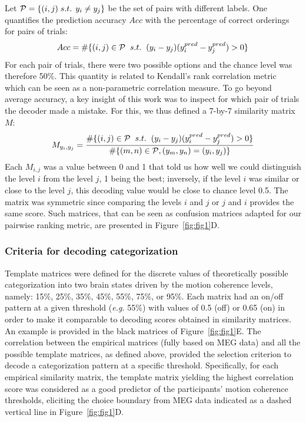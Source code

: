 Let $\mathcal{P}=\{(i,j) \hspace{1mm} s.t. \hspace{1.5mm} y_i \neq y_j\}$ be the set of pairs with different labels. One quantifies the prediction accuracy $Acc$ with the percentage of correct orderings for pairs of trials:
\begin{equation}
	Acc = \#\{(i,j) \in\mathcal{P} \hspace{2mm} s.t. \hspace{2mm} (y_i - y_j)(y_i^{pred} - y_j^{pred}) > 0 \}
\end{equation}
For each pair of trials, there were two possible options and the chance level was therefore 50\%. This quantity is related to Kendall’s rank correlation metric~\cite{46kruskal1958ordinal} which can be seen as a non-parametric correlation measure. To go beyond average accuracy, a key insight of this work was to inspect for which pair of trials the decoder made a mistake. For this, we thus defined a 7-by-7 similarity matrix $M$:
\begin{equation}
	M_{y_i,y_j} = \frac{\#\{(i,j)\in\mathcal{P} \hspace{2mm} s.t. \hspace{2mm} (y_i-y_j)(y_i^{pred}-y_j^{pred}) > 0\}}{\#\{(m,n)\in\mathcal{P}, (y_m, y_n) = (y_i, y_j)\}}
\end{equation}
Each $M_{i,j}$ was a value between 0 and 1 that told us how well we could distinguish the level $i$ from the level $j$, 1 being the best; inversely, if the level $i$ was similar or close to the level $j$, this decoding value would be close to chance level 0.5. The matrix was symmetric since comparing the levels $i$ and $j$ or $j$ and $i$  provides the same score. Such matrices, that can be seen as confusion matrices adapted for our pairwise ranking metric, are presented in Figure~\ref{fig:fig1}D.

\subsubsection*{Criteria for decoding categorization}
Template matrices were defined for the discrete values of theoretically possible categorization into two brain states driven by the motion coherence levels, namely: 15\%, 25\%, 35\%, 45\%, 55\%, 75\%, or 95\%. Each matrix had an on/off pattern at a given threshold (\textit{e.g.} 55\%) with values of 0.5 (off) or 0.65 (on) in order to make it comparable to decoding scores obtained in similarity matrices. An example is provided in the black matrices of Figure~\ref{fig:fig1}E. The correlation between the empirical matrices (fully based on MEG data) and all the possible template matrices, as defined above, provided the selection criterion to decode a categorization pattern at a specific threshold. Specifically, for each empirical similarity matrix, the template matrix yielding the highest correlation score was considered as a good predictor of the participants' motion coherence thresholds, eliciting the choice boundary from MEG data indicated as a dashed vertical line in Figure~\ref{fig:fig1}D.

